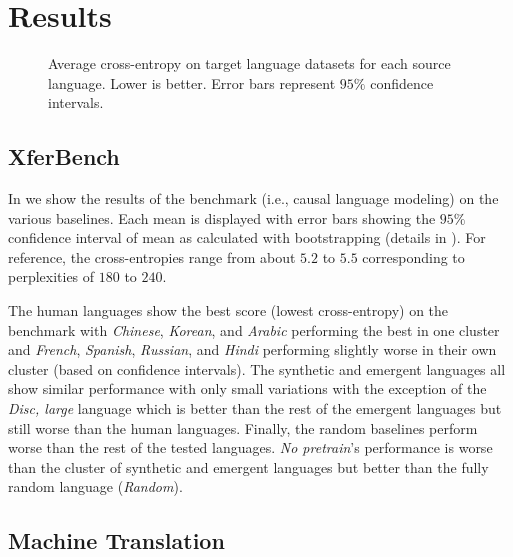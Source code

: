 \section{Results}

\begin{figure*}
  \centering
  \caption{%
    Average cross-entropy on target language datasets for each source language.
    Lower is better.
    Error bars represent $95\%$ confidence intervals.
  }
  \unskip\label{fig:ces}
\end{figure*}

\subsection{XferBench}

In  we show the results of the benchmark (i.e., causal language modeling) on the various baselines.
Each mean is displayed with error bars showing the $95\%$ confidence interval of mean as calculated with bootstrapping (details in ).
For reference, the cross-entropies range from about $5.2$ to $5.5$ corresponding to perplexities of $180$ to $240$.

The human languages show the best score (lowest cross-entropy) on the benchmark with \emph{Chinese}, \emph{Korean}, and \emph{Arabic} performing the best in one cluster and \emph{French}, \emph{Spanish}, \emph{Russian}, and \emph{Hindi} performing slightly worse in their own cluster (based on confidence intervals).
The synthetic and emergent languages all show similar performance with only small variations with the exception of the \emph{Disc, large} language which is better than the rest of the emergent languages but still worse than the human languages.
Finally, the random baselines perform worse than the rest of the tested languages.
\emph{No pretrain}'s performance is worse than the cluster of synthetic and emergent languages but better than the fully random language (\emph{Random}).


\subsection{Machine Translation}

\begin{table}[t]
  \centering
  \caption{%
    chrF scores across three English-to-French machine translation settings.
    Correlation measured with the Pearson correlation coefficient.
    Colors normalized by column.
  }
  \unskip\label{fig:mt}
\end{table}

